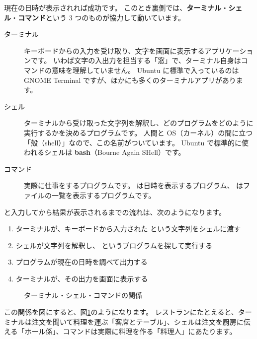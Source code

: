 
現在の日時が表示されれば成功です。
このとき裏側では、\textbf{ターミナル}・\textbf{シェル}・\textbf{コマンド}という 3 つのものが協力して動いています。

\begin{description}
  \item[ターミナル]
    キーボードからの入力を受け取り、文字を画面に表示するアプリケーションです。
    いわば文字の入出力を担当する「窓」で、ターミナル自身はコマンドの意味を理解していません。
    Ubuntu に標準で入っているのは GNOME Terminal ですが、ほかにも多くのターミナルアプリがあります。
  \item[シェル]
    ターミナルから受け取った文字列を解釈し、どのプログラムをどのように実行するかを決めるプログラムです。
    人間と OS（カーネル）の間に立つ「殻（shell）」なので、この名前がついています。
    Ubuntu で標準的に使われるシェルは \textbf{bash}（Bourne Again SHell）です。
  \item[コマンド]
    実際に仕事をするプログラムです。
     は日時を表示するプログラム、 はファイルの一覧を表示するプログラムです。
\end{description}

 と入力してから結果が表示されるまでの流れは、次のようになります。

\begin{enumerate}
  \item ターミナルが、キーボードから入力された  という文字列をシェルに渡す
  \item シェルが文字列を解釈し、 というプログラムを探して実行する
  \item {} プログラムが現在の日時を調べて出力する
  \item ターミナルが、その出力を画面に表示する
\end{enumerate}

\begin{figure}[tb]
  \centering
  
  \caption{ターミナル・シェル・コマンドの関係}
  \label{fig:terminal-shell-command}
\end{figure}

この関係を図にすると、図\ref{fig:terminal-shell-command}のようになります。
レストランにたとえると、ターミナルは注文を聞いて料理を運ぶ「客席とテーブル」、シェルは注文を厨房に伝える「ホール係」、コマンドは実際に料理を作る「料理人」にあたります。

